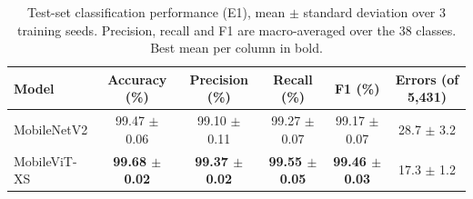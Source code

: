 \begin{table}[!t]
\centering
\footnotesize
\caption{Test-set classification performance (E1), mean $\pm$ standard deviation over 3 training seeds. Precision, recall and F1 are macro-averaged over the 38 classes. Best mean per column in bold.}
\label{tab:main}
\begin{tabular}{lccccc}
\toprule
Model & Accuracy (\%) & Precision (\%) & Recall (\%) & F1 (\%) & Errors (of 5{,}431) \\
\midrule
MobileNetV2 & 99.47 $\pm$ 0.06 & 99.10 $\pm$ 0.11 & 99.27 $\pm$ 0.07 & 99.17 $\pm$ 0.07 & 28.7 $\pm$ 3.2 \\
MobileViT-XS & \textbf{99.68 $\pm$ 0.02} & \textbf{99.37 $\pm$ 0.02} & \textbf{99.55 $\pm$ 0.05} & \textbf{99.46 $\pm$ 0.03} & 17.3 $\pm$ 1.2 \\
\bottomrule
\end{tabular}
\end{table}
